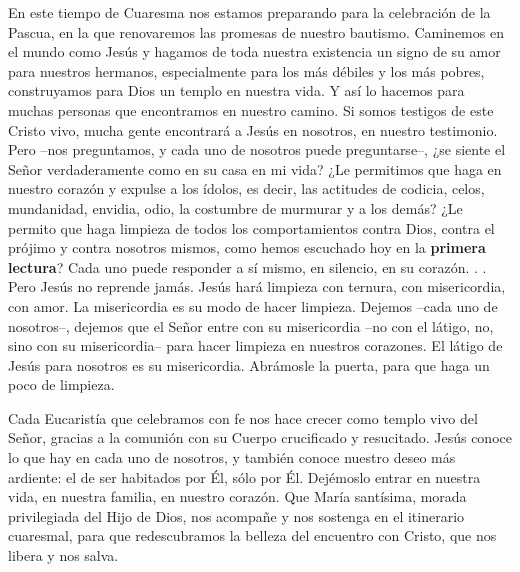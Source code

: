 \begin{body}
En este tiempo de Cuaresma nos estamos preparando para la celebración de la Pascua, en la que renovaremos las promesas de nuestro bautismo. Caminemos en el mundo como Jesús y hagamos de toda nuestra existencia un signo de su amor para nuestros hermanos, especialmente para los más débiles y los más pobres, construyamos para Dios un templo en nuestra vida. Y así lo hacemos  para muchas personas que encontramos en nuestro camino. Si somos testigos de este Cristo vivo, mucha gente encontrará a Jesús en nosotros, en nuestro testimonio. Pero –nos preguntamos, y cada uno de nosotros puede preguntarse–, ¿se siente el Señor verdaderamente como en su casa en mi vida? ¿Le permitimos que haga  en nuestro corazón y expulse a los ídolos, es decir, las actitudes de codicia, celos, mundanidad, envidia, odio, la costumbre de murmurar y  a los demás? ¿Le permito que haga limpieza de todos los comportamientos contra Dios, contra el prójimo y contra nosotros mismos, como hemos escuchado hoy en la \textbf{primera lectura}? Cada uno puede responder a sí mismo, en silencio, en su corazón. . . Pero Jesús no reprende jamás. Jesús hará limpieza con ternura, con misericordia, con amor. La misericordia es su modo de hacer limpieza. Dejemos –cada uno de nosotros–, dejemos que el Señor entre con su misericordia –no con el látigo, no, sino con su misericordia– para hacer limpieza en nuestros corazones. El látigo de Jesús para nosotros es su misericordia. Abrámosle la puerta, para que haga un poco de limpieza.

Cada Eucaristía que celebramos con fe nos hace crecer como templo vivo del Señor, gracias a la comunión con su Cuerpo crucificado y resucitado. Jesús conoce lo que hay en cada uno de nosotros, y también conoce nuestro deseo más ardiente: el de ser habitados por Él, sólo por Él. Dejémoslo entrar en nuestra vida, en nuestra familia, en nuestro corazón. Que María santísima, morada privilegiada del Hijo de Dios, nos acompañe y nos sostenga en el itinerario cuaresmal, para que redescubramos la belleza del encuentro con Cristo, que nos libera y nos salva.
\end{body}

